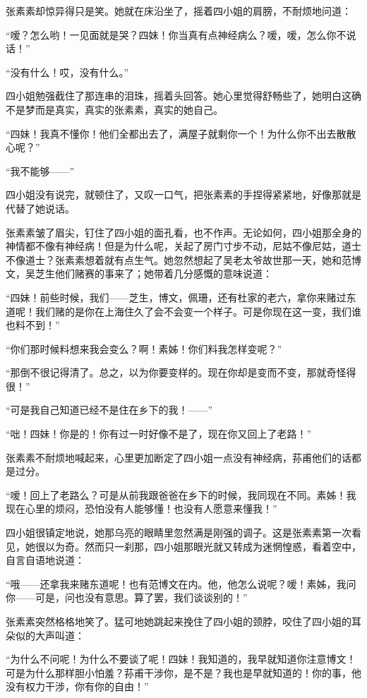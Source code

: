 \par 张素素却惊异得只是笑。她就在床沿坐了，摇着四小姐的肩膀，不耐烦地问道：
\par “嗳？怎么哟！一见面就是哭？四妹！你当真有点神经病么？嗳，嗳，怎么你不说话！”
\par “没有什么！哎，没有什么。”
\par 四小姐勉强截住了那连串的泪珠，摇着头回答。她心里觉得舒畅些了，她明白这确不是梦而是真实，真实的张素素，真实的她自己。
\par “四妹！我真不懂你！他们全都出去了，满屋子就剩你一个！为什么你不出去散散心呢？”
\par “我不能够——”
\par 四小姐没有说完，就顿住了，又叹一口气，把张素素的手捏得紧紧地，好像那就是代替了她说话。
\par 张素素皱了眉尖，钉住了四小姐的面孔看，也不作声。无论如何，四小姐那全身的神情都不像有神经病！但是为什么呢，关起了房门寸步不动，尼姑不像尼姑，道士不像道士？张素素想着就有点生气。她忽然想起了吴老太爷故世那一天，她和范博文，吴芝生他们赌赛的事来了；她带着几分感慨的意味说道：
\par “四妹！前些时候，我们——芝生，博文，佩珊，还有杜家的老六，拿你来赌过东道呢！我们赌的是你在上海住久了会不会变一个样子。可是你现在这一变，我们谁也料不到！”
\par “你们那时候料想来我会变么？啊！素姊！你们料我怎样变呢？”
\par “那倒不很记得清了。总之，以为你要变样的。现在你却是变而不变，那就奇怪得很！”
\par “可是我自己知道已经不是住在乡下的我！——”
\par “咄！四妹！你是的！你有过一时好像不是了，现在你又回上了老路！”
\par 张素素不耐烦地喊起来，心里更加断定了四小姐一点没有神经病，荪甫他们的话都是过分。
\par “嗳！回上了老路么？可是从前我跟爸爸在乡下的时候，我同现在不同。素姊！我现在心里的烦闷，恐怕没有人能够懂！也没有人愿意来懂我！”
\par 四小姐很镇定地说，她那乌亮的眼睛里忽然满是刚强的调子。这是张素素第一次看见，她很以为奇。然而只一刹那，四小姐那眼光就又转成为迷惘惶惑，看着空中，自言自语地说道：
\par “哦——还拿我来赌东道呢！也有范博文在内。他，他怎么说呢？嗳！素姊，我问你——可是，问也没有意思。算了罢，我们谈谈别的！”
\par 张素素突然格格地笑了。猛可地她跳起来挽住了四小姐的颈脖，咬住了四小姐的耳朵似的大声叫道：
\par “为什么不问呢！为什么不要谈了呢！四妹！我知道的，我早就知道你注意博文！可是为什么那样胆小怕羞？荪甫干涉你，是不是？我也是早就知道的！你的事，他没有权力干涉，你有你的自由！”
